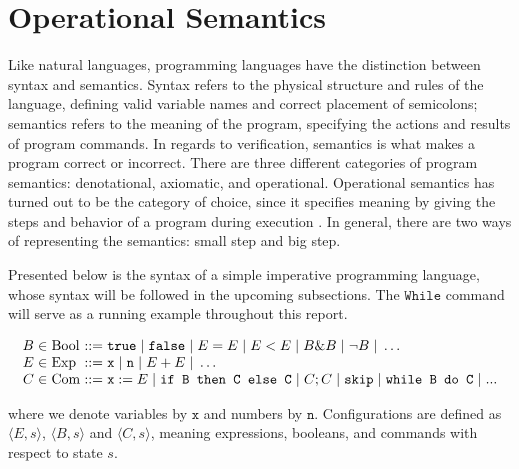 \documentclass[a4paper,11pt,twoside]{report}
\begin{document}
\section{Operational Semantics}\label{sec:opsem}
Like natural languages, programming languages have the distinction between syntax and semantics. Syntax refers to the physical structure and rules of the language, defining valid variable names and correct placement of semicolons; semantics refers to the meaning of the program, specifying the actions and results of program commands. In regards to verification, semantics is what makes a program correct or incorrect. There are three different categories of program semantics: denotational, axiomatic, and operational. Operational semantics has turned out to be the category of choice, since it specifies meaning by giving the steps and behavior of a program during execution \cite{PittsAM:opespe}. In general, there are two ways of representing the semantics: small step and big step. 

Presented below is the syntax of a simple imperative programming language, whose syntax will be followed in the upcoming subsections. The $\mathtt{While}$ command will serve as a running example throughout this report.

$$
\arraycolsep=1.5pt
\begin{array}{rclcl}
B & \in & \mathrm{Bool} & ::= & \texttt{true} \myor \texttt{false} \myor E = E \myor E < E \myor B \& B \myor\neg B \myor \ldots \\
E & \in & \mathrm{Exp} & ::= & \texttt{x} \myor \texttt{n} \myor E + E \myor \ldots \\
C & \in & \mathrm{Com} & ::= & \texttt{x}:=E \myor \texttt{if B then C else C} \myor C; C \myor \texttt{skip} \myor \texttt{while B do C} \myor ...
\end{array}
$$

\noindent where we denote variables by $\texttt{x}$ and numbers by $\texttt{n}$. 
Configurations are defined as $\langle E,s \rangle$, $\langle B,s\rangle$ and $\langle C,s \rangle$, meaning expressions, booleans, and commands with respect to state $s$.
\end{document}

